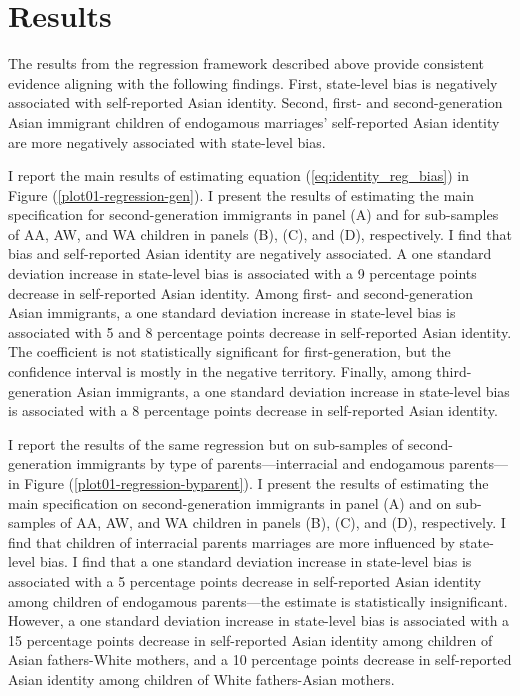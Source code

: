 \section{Results}\label{sec:results}
The results from the regression framework described above provide consistent evidence aligning with the following findings. First, state-level bias is negatively associated with self-reported Asian identity. Second, first- and second-generation Asian immigrant children of endogamous marriages' self-reported Asian identity are more negatively associated with state-level bias. 

I report the main results of estimating equation (\ref{eq:identity_reg_bias}) in Figure (\ref{plot01-regression-gen}). I present the results of estimating the main specification for second-generation immigrants in panel (A) and for sub-samples of AA, AW, and WA children in panels (B), (C), and (D), respectively. I find that bias and self-reported Asian identity are negatively associated. A one standard deviation increase in state-level bias is associated with a 9 percentage points decrease in self-reported Asian identity. Among first- and second-generation Asian immigrants, a one standard deviation increase in state-level bias is associated with 5 and 8 percentage points decrease in self-reported Asian identity. The coefficient is not statistically significant for first-generation, but the confidence interval is mostly in the negative territory. Finally, among third-generation Asian immigrants, a one standard deviation increase in state-level bias is associated with a 8 percentage points decrease in self-reported Asian identity.

I report the results of the same regression but on sub-samples of second-generation immigrants by type of parents---interracial and endogamous parents---in Figure (\ref{plot01-regression-byparent}). I present the results of estimating the main specification on second-generation immigrants in panel (A) and on sub-samples of AA, AW, and WA children in panels (B), (C), and (D), respectively. I find that children of interracial parents marriages are more influenced by state-level bias. I find that a one standard deviation increase in state-level bias is associated with a 5 percentage points decrease in self-reported Asian identity among children of endogamous parents---the estimate is statistically insignificant. However, a one standard deviation increase in state-level bias is associated with a 15 percentage points decrease in self-reported Asian identity among children of Asian fathers-White mothers, and a 10 percentage points decrease in self-reported Asian identity among children of White fathers-Asian mothers.

